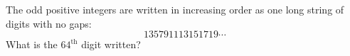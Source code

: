 The odd positive integers are written in increasing order as one long string of digits with no gaps:
\[
135791113151719\cdots
\]
What is the $64^{\text{th}}$ digit written?
